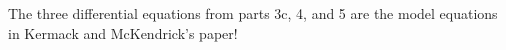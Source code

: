 \documentclass[12pt]{article}
\begin{document}
\begin{enumerate}[resume]
\noindent The three differential equations from parts 3c, 4, and 5 are the model equations in Kermack and McKendrick's paper!


%


\end{enumerate}
\end{document}
